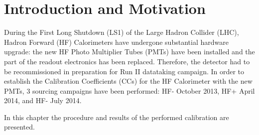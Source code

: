 \section{Introduction and Motivation}
During the First Long Shutdown (LS1) of the Large Hadron Collider (LHC), Hadron Forward (HF) Calorimeters have undergone substantial hardware upgrade: the
new HF Photo Multiplier Tubes (PMTs) have been installed and the part of the readout electronics has been replaced. Therefore, the detector had to be recommissioned in preparation for Run II datataking campaign. In order to establish the Calibration Coefficients (CCs) for the HF Calorimeter with the new PMTs, 3 sourcing campaigns have been performed: HF- October 2013, HF+ April 2014, and HF- July 2014.

In this chapter the procedure and results of the performed calibration are presented.


